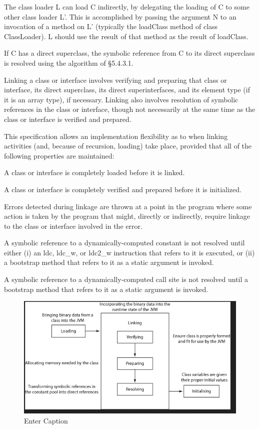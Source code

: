     The class loader L can load C indirectly, by delegating the loading of C to some other class loader L'. This is accomplished by passing the argument N to an invocation of a method on L' (typically the loadClass method of class ClassLoader). L should use the result of that method as the result of loadClass.

If C has a direct superclass, the symbolic reference from C to its direct superclass is resolved using the algorithm of §5.4.3.1. 

Linking a class or interface involves verifying and preparing that class or interface, its direct superclass, its direct superinterfaces, and its element type (if it is an array type), if necessary. Linking also involves resolution of symbolic references in the class or interface, though not necessarily at the same time as the class or interface is verified and prepared. 

This specification allows an implementation flexibility as to when linking activities (and, because of recursion, loading) take place, provided that all of the following properties are maintained:

    A class or interface is completely loaded before it is linked.

    A class or interface is completely verified and prepared before it is initialized.

    Errors detected during linkage are thrown at a point in the program where some action is taken by the program that might, directly or indirectly, require linkage to the class or interface involved in the error.

    A symbolic reference to a dynamically-computed constant is not resolved until either (i) an ldc, ldc_w, or ldc2_w instruction that refers to it is executed, or (ii) a bootstrap method that refers to it as a static argument is invoked.

    A symbolic reference to a dynamically-computed call site is not resolved until a bootstrap method that refers to it as a static argument is invoked.


\begin{figure}
    \centering
    \includegraphics[width=1\linewidth]{resources/class_loading.png}
    \caption{Enter Caption}
    \label{fig:enter-label}
\end{figure}

